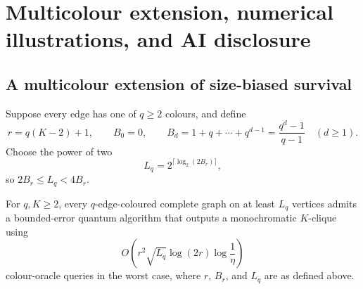 \section{Multicolour extension, numerical illustrations, and AI disclosure}

\subsection{A multicolour extension of size-biased survival}
\label{app:multicolour}

Suppose every edge has one of $q\ge2$ colours, and define
\[
 r=q(K-2)+1,
 \qquad
 B_0=0,
 \qquad
 B_d=1+q+\cdots+q^{d-1}=\frac{q^d-1}{q-1}\quad(d\ge1).
\]
Choose the power of two
\[
 L_q=2^{\lceil\log_2(2B_r)\rceil},
\]
so $2B_r\le L_q<4B_r$.

\begin{corollary}
\label{cor:multicolour}
For $q,K\ge2$, every $q$-edge-coloured complete graph on at least $L_q$
vertices admits a bounded-error quantum algorithm that outputs a
monochromatic $K$-clique using
\[
 O\!\left(r^2\sqrt{L_q}\log(2r)\log\frac1\eta\right)
\]
colour-oracle queries in the worst case, where $r$, $B_r$, and $L_q$ are as
defined above.
\end{corollary}

